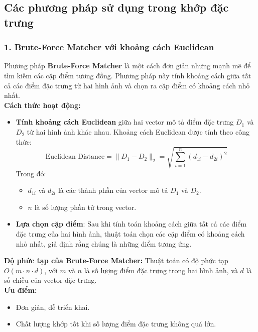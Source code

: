 \subsection*{Các phương pháp sử dụng trong khớp đặc trưng}

\subsubsection*{1. Brute-Force Matcher với khoảng cách Euclidean}

Phương pháp \textbf{Brute-Force Matcher} là một cách đơn giản nhưng mạnh mẽ để tìm kiếm các cặp điểm tương đồng. Phương pháp này tính khoảng cách giữa tất cả các điểm đặc trưng từ hai hình ảnh và chọn ra cặp điểm có khoảng cách nhỏ nhất.\\

\textbf{Cách thức hoạt động:}
\begin{itemize}
	\item \textbf{Tính khoảng cách Euclidean} giữa hai vector mô tả điểm đặc trưng \(D_1\) và \(D_2\) từ hai hình ảnh khác nhau. Khoảng cách Euclidean được tính theo công thức:
	\[
	\text{Euclidean Distance} = \| D_1 - D_2 \|_2 = \sqrt{\sum_{i=1}^{n} (d_{1i} - d_{2i})^2}
	\]
	Trong đó:
	\begin{itemize}
		\item \(d_{1i}\) và \(d_{2i}\) là các thành phần của vector mô tả \(D_1\) và \(D_2\).
		\item \(n\) là số lượng phần tử trong vector.
	\end{itemize}
	
	\item \textbf{Lựa chọn cặp điểm}: Sau khi tính toán khoảng cách giữa tất cả các điểm đặc trưng của hai hình ảnh, thuật toán chọn các cặp điểm có khoảng cách nhỏ nhất, giả định rằng chúng là những điểm tương ứng.
\end{itemize}

\textbf{Độ phức tạp của Brute-Force Matcher:} Thuật toán có độ phức tạp \(O(m \cdot n \cdot d)\), với \(m\) và \(n\) là số lượng điểm đặc trưng trong hai hình ảnh, và \(d\) là số chiều của vector đặc trưng.\\

\textbf{Ưu điểm:}
\begin{itemize}
	\item Đơn giản, dễ triển khai.
	\item Chất lượng khớp tốt khi số lượng điểm đặc trưng không quá lớn.
\end{itemize}

